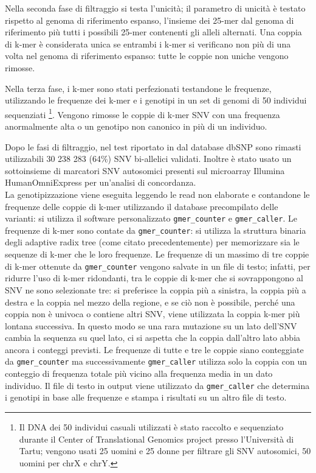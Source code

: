 \documentclass[../main.tex]{subfiles}
\begin{document}
Nella seconda fase di filtraggio si testa l'unicità; il parametro di unicità è testato rispetto al genoma di riferimento espanso, l'insieme dei 25-mer dal genoma di riferimento più tutti i possibili 25-mer contenenti gli alleli alternati. Una coppia di k-mer è considerata unica se entrambi i k-mer si verificano non più di una volta nel genoma di riferimento espanso: tutte le coppie non uniche vengono rimosse.

Nella terza fase, i k-mer sono stati perfezionati testandone le frequenze, utilizzando le frequenze dei k-mer e i genotipi in un set di genomi di 50 individui sequenziati \footnote{Il DNA dei 50 individui casuali utilizzati è stato raccolto e sequenziato durante il Center of Translational Genomics project presso l'Università di Tartu; vengono usati 25 uomini e 25 donne per filtrare gli SNV autosomici, 50 uomini per chrX e chrY. }. Vengono rimosse le coppie di k-mer SNV con una frequenza anormalmente alta o un genotipo non canonico in più di un individuo.

Dopo le fasi di filtraggio, nel test riportato in \cite{pajuste2017fastgt} dal database dbSNP sono rimasti utilizzabili 30 238 283 (64\%) SNV bi-allelici validati. Inoltre è stato usato un sottoinsieme di marcatori SNV autosomici presenti sul microarray Illumina HumanOmniExpress per un'analisi di concordanza.  \\

La genotipizzazione viene eseguita leggendo le read non elaborate e contandone le frequenze delle coppie di k-mer utilizzando il database precompilato delle varianti: si utilizza il software personalizzato \texttt{gmer\_counter} e \texttt{gmer\_caller}. Le frequenze di k-mer sono contate da \texttt{gmer\_counter}: si utilizza la struttura binaria degli adaptive radix tree (come citato precedentemente) per memorizzare sia le sequenze di k-mer che le loro frequenze. Le frequenze di un massimo di tre coppie di k-mer ottenute da \texttt{gmer\_counter} vengono salvate in un file di testo; infatti, per ridurre l'uso di k-mer ridondanti, tra le coppie di k-mer che si sovrappongono al SNV ne sono selezionate tre: si preferisce la coppia più a sinistra, la coppia più a destra e la coppia nel mezzo della regione, e se ciò non è possibile, perché una coppia non è univoca o contiene altri SNV, viene utilizzata la coppia k-mer più lontana successiva. In questo modo se una rara mutazione su un lato dell'SNV cambia la sequenza su quel lato, ci si aspetta che la coppia dall'altro lato abbia ancora i conteggi previsti. Le frequenze di tutte e tre le coppie siano conteggiate da \texttt{gmer\_counter} ma successivamente \texttt{gmer\_caller} utilizza solo la coppia con un conteggio di frequenza totale più vicino alla frequenza media in un dato individuo. Il file di testo in output viene utilizzato da \texttt{gmer\_caller} che determina i genotipi in base alle frequenze e stampa i risultati su un altro file di testo. 
\end{document}
